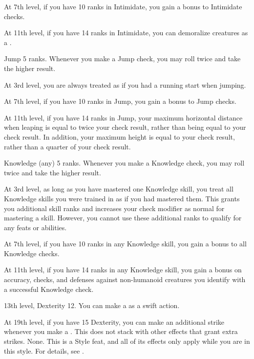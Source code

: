     At 7th level, if you have 10 ranks in Intimidate, you gain a  bonus to Intimidate checks.

    At 11th level, if you have 14 ranks in Intimidate, you can demoralize creatures as a .

    \featpre Jump 5 ranks.
    \featben Whenever you make a Jump check, you may roll twice and take the higher result.

    At 3rd level, you are always treated as if you had a running start when jumping.

    At 7th level, if you have 10 ranks in Jump, you gain a  bonus to Jump checks.

    At 11th level, if you have 14 ranks in Jump, your maximum horizontal distance when leaping is equal to twice your check result, rather than being equal to your check result.
    In addition, your maximum height is equal to your check result, rather than a quarter of your check result.

    \featpre Knowledge (any) 5 ranks.
    \featben Whenever you make a Knowledge check, you may roll twice and take the higher result.

    At 3rd level, as long as you have mastered one Knowledge skill, you treat all Knowledge skills you were trained in as if you had mastered them.
    This grants you additional skill ranks and increases your check modifier as normal for mastering a skill.
    However, you cannot use these additional ranks to qualify for any feats or abilities.

    At 7th level, if you have 10 ranks in any Knowledge skill, you gain a  bonus to all Knowledge checks.

    At 11th level, if you have 14 ranks in any Knowledge skill, you gain a  bonus on accuracy, checks, and defenses against non-humanoid creatures you identify with a successful Knowledge check.

    \featpres 13th level, Dexterity 12.
    \featben You can make a  as a swift action.

    At 19th level, if you have 15 Dexterity, you can make an additional strike whenever you make a .
    This does not stack with other effects that grant extra strikes.
    \stylereq None.
     This is a Style feat, and all of its effects only apply while you are in this style.
    For details, see .

